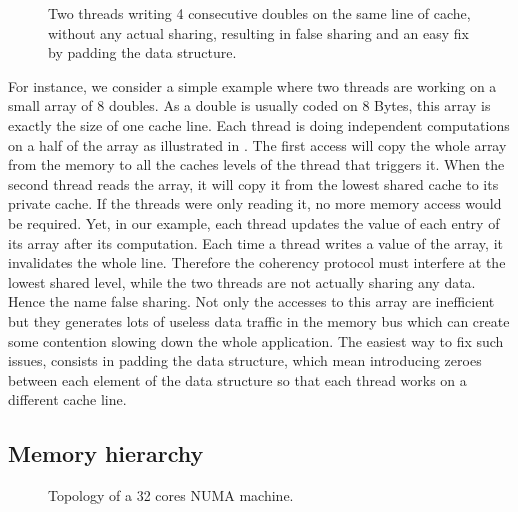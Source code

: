 \begin{figure}[htb]
    \centering
    
    \caption[Example of false sharing.]{Two threads writing 4 consecutive doubles on the same line of cache, without any actual sharing, resulting in false sharing and an easy fix by padding the data structure.}
    \label{fig:false-sharing}
\end{figure}

For instance, we  consider a simple example where two threads are working on a small array of $8$ doubles.
As a double is usually coded on $8$ Bytes, this array is exactly the size of one cache line.
Each thread is doing independent computations on a half of the array as illustrated in .
The first access will copy the whole array from the memory to all the caches levels of the thread that triggers it.
When the second thread reads the array, it will copy it from the lowest shared cache to its private cache.
If the threads were only reading it, no more memory access would be required.
Yet, in our example, each thread updates the value of each entry of its array after its computation.
Each time a thread writes a value of the array, it invalidates the whole line.
Therefore the coherency protocol must interfere at the lowest shared level, while the two threads are not actually sharing any data.
Hence the name false sharing.
Not only the accesses to this array are inefficient but they generates lots of useless data traffic in the memory bus which can create some contention slowing down the whole application.
The easiest way to fix such issues, consists in padding the data structure, which mean introducing zeroes between each element of the data structure so that each thread works on a different cache line.

\subsection{Memory hierarchy}

\begin{figure}[htb]
    \centering
    
    \caption{Topology of a 32 cores NUMA machine.}
    \label{fig:topo-NUMA}
\end{figure}


